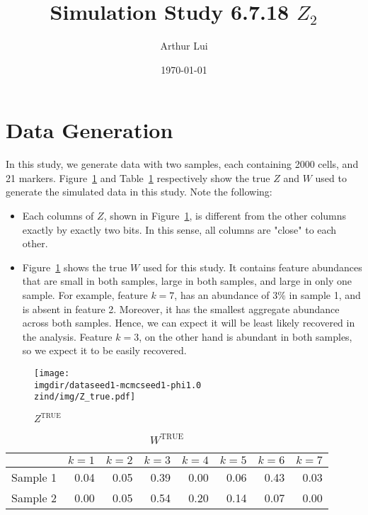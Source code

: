 \documentclass[10pt]{article} %
\title{Simulation Study 6.7.18 $Z_2$}
\author{Arthur Lui}
\date{\today} %
\def\true{\text{TRUE}}
\def\imgdir{../../../results/test-sim-6-7-18}
\def\zind{-Zind2}
\begin{document}
\maketitle



\section{Data Generation}\label{sec:data-generation}
In this study, we generate data with two samples, each containing 2000 cells,
and 21 markers. Figure~\ref{fig:Z-true} and Table~\ref{tab:W-true}
respectively show the true $Z$ and $W$ used to generate the simulated data in
this study. Note the following:
\begin{itemize}
  \item Each columns of $Z$, shown in Figure~\ref{fig:Z-true}, is different
    from the other columns exactly by exactly two bits. In this sense, all
    columns are "close" to each other.
  \item Figure~\ref{tab:W-true} shows the true $W$ used for this study. It
    contains feature abundances that are small in both samples, large in both
    samples, and large in only one sample. For example, feature $k=7$, 
    has an abundance of $3\%$ in sample 1, and is absent in feature 2. 
    Moreover, it has the smallest aggregate abundance across both samples. 
    Hence, we can expect it will be least likely recovered in the analysis. 
    Feature $k=3$, on the other hand is abundant in both samples, so we expect
    it to be easily recovered.
\end{itemize}

\begin{figure}[H]
  \begin{center}  %
    \texttt{[image: \\imgdir/dataseed1-mcmcseed1-phi1.0\\zind/img/Z\_true.pdf]}
  \end{center}
  \caption{$Z^\true$}
  \label{fig:Z-true}
\end{figure}

\begin{table}[ht]
  \centering
  \begin{tabular}{rrrrrrrr}
    \hline
    & $k=1$ & $k=2$ & $k=3$ & $k=4$ & $k=5$ & $k=6$ & $k=7$ \\
    \hline
    Sample 1 & 0.04 & 0.05 & 0.39 & 0.00 & 0.06 & 0.43 & 0.03 \\
    Sample 2 & 0.00 & 0.05 & 0.54 & 0.20 & 0.14 & 0.07 & 0.00 \\
    \hline
  \end{tabular}
  \caption{$W^\true$}
  \label{tab:W-true}
\end{table}
\end{document}
